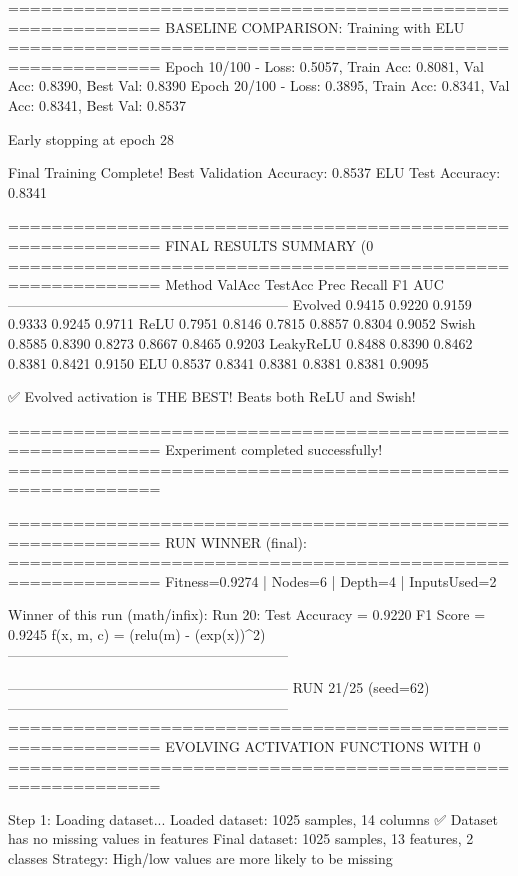 ============================================================
BASELINE COMPARISON: Training with ELU
============================================================
Epoch  10/100 - Loss: 0.5057, Train Acc: 0.8081, Val Acc: 0.8390, Best Val: 0.8390
Epoch  20/100 - Loss: 0.3895, Train Acc: 0.8341, Val Acc: 0.8341, Best Val: 0.8537

Early stopping at epoch 28

Final Training Complete!
Best Validation Accuracy: 0.8537
ELU Test Accuracy: 0.8341

============================================================
FINAL RESULTS SUMMARY (0%
============================================================
Method             ValAcc     TestAcc    Prec       Recall     F1         AUC
------------------------------------------------------------
Evolved            0.9415     0.9220     0.9159     0.9333     0.9245     0.9711
ReLU               0.7951     0.8146     0.7815     0.8857     0.8304     0.9052
Swish              0.8585     0.8390     0.8273     0.8667     0.8465     0.9203
LeakyReLU          0.8488     0.8390     0.8462     0.8381     0.8421     0.9150
ELU                0.8537     0.8341     0.8381     0.8381     0.8381     0.9095

✅ Evolved activation is THE BEST! Beats both ReLU and Swish!

============================================================
Experiment completed successfully!
============================================================

============================================================
RUN WINNER (final):
============================================================
Fitness=0.9274 | Nodes=6 | Depth=4 | InputsUsed=2

Winner of this run (math/infix):
  Run 20:
     Test Accuracy = 0.9220
     F1 Score      = 0.9245
     f(x, m, c)    = (relu(m) - (exp(x))^2)
------------------------------------------------------------

------------------------------------------------------------
RUN 21/25 (seed=62)
------------------------------------------------------------
============================================================
EVOLVING ACTIVATION FUNCTIONS
WITH 0%
============================================================

Step 1: Loading dataset...
Loaded dataset: 1025 samples, 14 columns
✅ Dataset has no missing values in features
Final dataset: 1025 samples, 13 features, 2 classes
Strategy: High/low values are more likely to be missing

